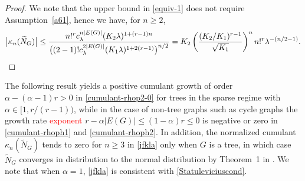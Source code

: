 \documentclass[bj,authoryear,noshowframe]{imsart}
\theoremstyle{plain}
\theoremstyle{remark}
\begin{document}
\begin{proof}
  We note that the upper bound in \eqref{equiv-1}
  does not require Assumption~\ref{a61},
  hence we have, for $n\geq 2$,
$$ 
   \big|\kappa_n(\widetilde{N}_G)\big|
  \leq 
   \frac{n!^r %
     c_\lambda^{n|E(G)|} (K_2 \lambda )^{1+(r-1)n}}{\big((2-1)! c_\lambda^{2|E(G)|}
   (K_1 \lambda )^{1+2(r-1)}\big)^{n/2}}
 = 
   K_2
   \left(
   \frac{ %
      (K_2/K_1)^{r-1}}{\sqrt{K_1}}
   \right)^n
   n!^r \lambda^{-(n/2-1)}. 
$$ 
\end{proof}
The following result yields a positive cumulant growth
of order $\alpha     -(\alpha - 1)r>0$
in \eqref{cumulant-rhop2-0} for trees in the sparse regime
with $\alpha \in [1, r/(r-1) )$,
while in the case of non-tree graphs such as
cycle graphs the growth rate \textcolor{red}{exponent}
$r - \alpha |E(G)|
\leq ( 1 - \alpha ) r \leq 0$
is negative or zero in \eqref{cumulant-rhoph1} and \eqref{cumulant-rhoph2}. 
In addition, the normalized cumulant 
$\kappa_n(\widetilde{N}_G)$ tends to zero for $n\geq 3$ in \eqref{jfkla} only
when $G$ is a tree, in which case 
$\widetilde{N}_G$ converges in distribution to the normal
distribution by Theorem~1 in \cite{Janson1988}.   
We note that when $\alpha = 1$, \eqref{jfkla} is consistent with
 \eqref{Statuleviciuscond}. 
\end{document}
